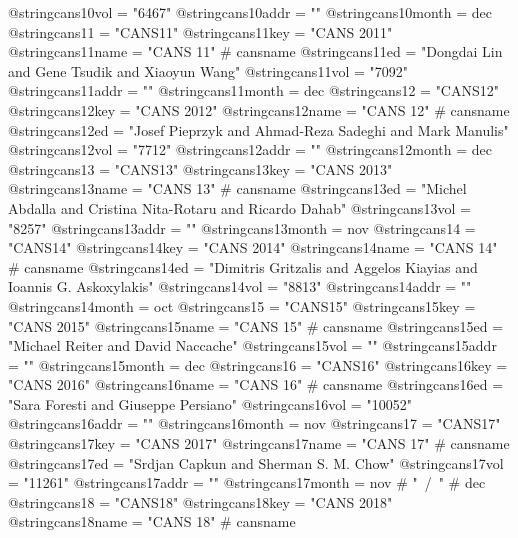 @string{cans10vol =             "6467"}
@string{cans10addr =            ""}
@string{cans10month =           dec}
@string{cans11 =                "CANS11"}
@string{cans11key =             "CANS 2011"}
@string{cans11name =            "CANS 11" # cansname}
@string{cans11ed =              "Dongdai Lin and Gene Tsudik and Xiaoyun Wang"}
@string{cans11vol =             "7092"}
@string{cans11addr =            ""}
@string{cans11month =           dec}
@string{cans12 =                "CANS12"}
@string{cans12key =             "CANS 2012"}
@string{cans12name =            "CANS 12" # cansname}
@string{cans12ed =              "Josef Pieprzyk and Ahmad-Reza Sadeghi and Mark Manulis"}
@string{cans12vol =             "7712"}
@string{cans12addr =            ""}
@string{cans12month =           dec}
@string{cans13 =                "CANS13"}
@string{cans13key =             "CANS 2013"}
@string{cans13name =            "CANS 13" # cansname}
@string{cans13ed =              "Michel Abdalla and Cristina Nita-Rotaru and Ricardo Dahab"}
@string{cans13vol =             "8257"}
@string{cans13addr =            ""}
@string{cans13month =           nov}
@string{cans14 =                "CANS14"}
@string{cans14key =             "CANS 2014"}
@string{cans14name =            "CANS 14" # cansname}
@string{cans14ed =              "Dimitris Gritzalis and Aggelos Kiayias and Ioannis G. Askoxylakis"}
@string{cans14vol =             "8813"}
@string{cans14addr =            ""}
@string{cans14month =           oct}
@string{cans15 =                "CANS15"}
@string{cans15key =             "CANS 2015"}
@string{cans15name =            "CANS 15" # cansname}
@string{cans15ed =              "Michael Reiter and David Naccache"}
@string{cans15vol =             ""}
@string{cans15addr =            ""}
@string{cans15month =           dec}
@string{cans16 =                "CANS16"}
@string{cans16key =             "CANS 2016"}
@string{cans16name =            "CANS 16" # cansname}
@string{cans16ed =              "Sara Foresti and Giuseppe Persiano"}
@string{cans16vol =             "10052"}
@string{cans16addr =            ""}
@string{cans16month =           nov}
@string{cans17 =                "CANS17"}
@string{cans17key =             "CANS 2017"}
@string{cans17name =            "CANS 17" # cansname}
@string{cans17ed =              "Srdjan Capkun and Sherman S. M. Chow"}
@string{cans17vol =             "11261"}
@string{cans17addr =            ""}
@string{cans17month =           nov # "~/~" # dec}
@string{cans18 =                "CANS18"}
@string{cans18key =             "CANS 2018"}
@string{cans18name =            "CANS 18" # cansname}
